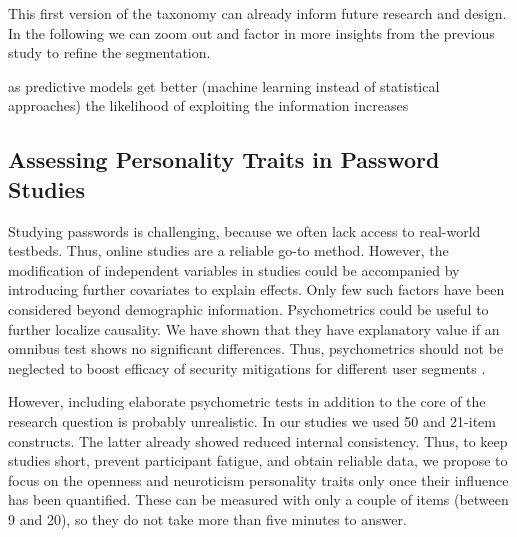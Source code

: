 This first version of the taxonomy can already inform future research and design. In the following we can zoom out and factor in more insights from the previous study to refine the segmentation.


as predictive models get better (machine learning instead of statistical approaches) the likelihood of exploiting the information increases



\subsection{Assessing Personality Traits in Password Studies}
Studying passwords is challenging, because we often lack access to real-world testbeds. Thus, online studies are a reliable go-to method. However, the modification of independent variables in studies could be accompanied by introducing further covariates to explain effects. Only few such factors have been considered beyond demographic information. Psychometrics could be useful to further localize causality. We have shown that they have explanatory value if an omnibus test shows no significant differences. Thus, psychometrics should not be neglected to boost efficacy of security mitigations for different user segments \cite{Egelman2015AverageUser}. 

However, including elaborate psychometric tests in addition to the core of the research question is probably unrealistic. In our studies we used 50 and 21-item constructs. The latter already showed reduced internal consistency. Thus, to keep studies short, prevent participant fatigue, and obtain reliable data, we propose to focus on the openness and neuroticism personality traits only once their influence has been quantified. These can be measured with only a couple of items (between 9 and 20), so they do not take more than five minutes to answer. 

